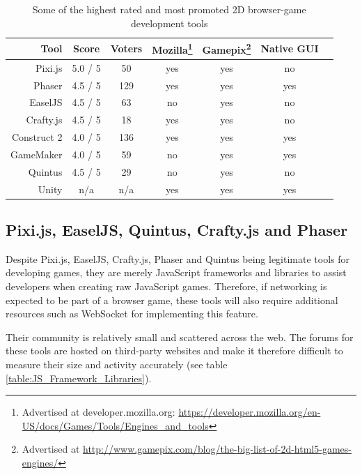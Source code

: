 \documentclass[bsc,frontabs,twoside,singlespacing,parskip,deptreport]{infthesis}     %
\begin{document}
\begin{savenotes}
\begin{table}
\centering
  \begin{tabular}{ | r || c | c | c | c | c | c | }
  	\hline
  	\textbf{Tool}			& \textbf{Score}		& \textbf{Voters}& \textbf{Mozilla}\footnote{Advertised at developer.mozilla.org: \url{https://developer.mozilla.org/en-US/docs/Games/Tools/Engines\_and\_tools}} 	& \textbf{Gamepix}\footnote{Advertised at \url{http://www.gamepix.com/blog/the-big-list-of-2d-html5-games-engines/}} 	& \textbf{Native GUI}\\ \hline\hline
    Pixi.js			& 5.0 / 5	& 50	& yes	& yes	& no	\\ \hline
    Phaser			& 4.5 / 5	& 129	& yes	& yes	& yes	\\ \hline
    EaselJS			& 4.5 / 5	& 63	& no	& yes	& no	\\ \hline
    Crafty.js		& 4.5 / 5	& 18	& yes	& yes	& no	\\ \hline
    Construct 2		& 4.0 / 5	& 136	& yes	& yes	& yes	\\ \hline
    GameMaker		& 4.0 / 5	& 59	& no	& yes	& yes	\\ \hline
   	Quintus			& 4.5 / 5	& 29	& no	& yes	& no	\\ \hline
  	Unity			& n/a		& n/a	& yes	& yes	& yes	\\ \hline
  \end{tabular}
  \caption{Some of the highest rated and most promoted 2D browser-game development tools}
  \label{table:Related_Tools}
\end{table}%
\end{savenotes}

\subsection{Pixi.js, EaselJS, Quintus, Crafty.js and Phaser}
Despite Pixi.js, EaselJS, Crafty.js, Phaser and Quintus being legitimate tools for developing games, they are merely JavaScript frameworks and libraries to assist developers when creating raw JavaScript games. Therefore, if networking is expected to be part of a browser game, these tools will also require additional resources such as WebSocket for implementing this feature.

Their community is relatively small and scattered across the web. The forums for these tools are hosted on third-party websites and make it therefore difficult to measure their size and activity accurately (see table \ref{table:JS_Framework_Libraries}).
\end{document}
